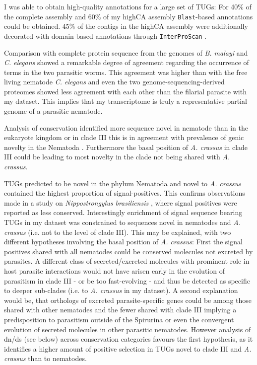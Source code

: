 I was able to obtain high-quality annotations for a large set of TUGs:
For 40\% of the complete assembly and 60\% of my highCA assembly
\texttt{Blast}-based annotations could be obtained. 45\% of the
contigs in the highCA assembly were additionally decorated with
domain-based annotations through \texttt{InterProScan}
\cite{pmid11590104}.

Comparison with complete protein sequence from the genomes of
\textit{B. malayi} and \textit{C. elegans} showed a remarkable degree
of agreement regarding the occurrence of terms in the two parasitic
worms. This agreement was higher than with the free living nematode
\textit{C. elegans} and even the two genome-sequencing-derived
proteomes showed less agreement with each other than the filarial
parasite with my dataset. This implies that my transcriptome is truly
a representative partial genome
\cite{parkinson_partigene--constructing_2004} of a parasitic nematode.

Analysis of conservation identified more sequence novel in nematode
than in the eukaryote kingdom or in clade III this is in agreement
with prevalence of genic novelty in the Nematoda
\cite{wasmuth_extent_2008}. Furthermore the basal position of
\textit{A. crassus} in clade III could be leading to most novelty in
the clade not being shared with \textit{A. crassus}.

TUGs predicted to be novel in the phylum Nematoda and novel to
\textit{A. crassus} contained the highest proportion of
signal-positives. This confirms observations made in a study on
\textit{Nippostrongylus brasiliensis} \cite{harcus_signal_2004}, where
signal positives were reported as less conserved. Interestingly
enrichment of signal sequence bearing TUGs in my dataset was
constrained to sequences novel in nematodes and \textit{A. crassus}
(i.e. not to the level of clade III). This may be explained, with two
different hypotheses involving the basal position of
\textit{A. crassus}: First the signal positives shared with all
nematodes could be conserved molecules not excreted by parasites. A
different class of secreted/excreted molecules with prominent role in
host parasite interactions would not have arisen early in the
evolution of parasitism in clade III - or be too fast-evolving - and
thus be detected as specific to deeper sub-clades (i.e. to
\textit{A. crassus} in my dataset). A second explanation would be,
that orthologs of excreted parasite-specific genes could be among
those shared with other nematodes and the fewer shared with clade III
implying a predisposition to parasitism outside of the Spirurina or
even the convergent evolution of secreted molecules in other parasitic
nematodes. However analysis of dn/ds (see below) across conservation
categories favours the first hypothesis, as it identifies a higher
amount of positive selection in TUGs novel to clade III and
\textit{A. crassus} than to nematodes.

